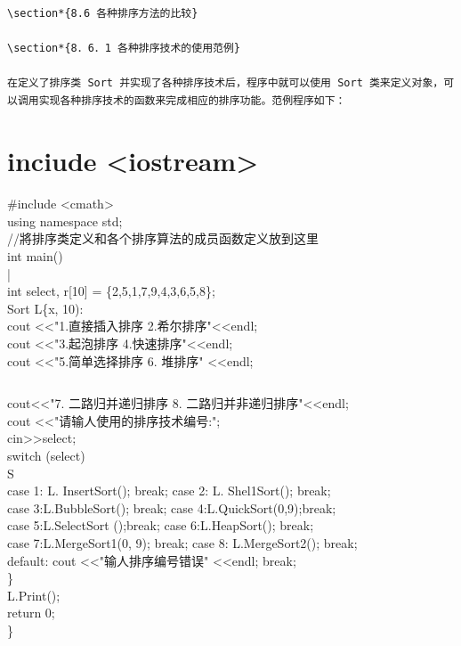 \documentclass[10pt]{article}
\begin{document}
\begin{verbatim}

\section*{8.6 各种排序方法的比较}

\section*{8．6．1 各种排序技术的使用范例}

在定义了排序类 Sort 并实现了各种排序技术后，程序中就可以使用 Sort 类来定义对象，可以调用实现各种排序技术的函数来完成相应的排序功能。范例程序如下：
\end{verbatim}

\section*{inciude <iostream>}
\#include <cmath>\\
using namespace std;\\
//將排序类定义和各个排序算法的成员函数定义放到这里\\
int main()\\
|\\[0pt]
int select, r[10] = \{2,5,1,7,9,4,3,6,5,8\};\\
Sort L\{x, 10):\\
cout <<"1.直接插入排序 2.希尔排序"<<endl;\\
cout <<"3.起泡排序 4.快速排序"<<endl;\\
cout <<"5.简单选择排序 6. 堆排序" <<endl;

\begin{verbatim}

\end{verbatim}

cout<<"7. 二路归并递归排序 8. 二路归并非递归排序"<<endl;\\
cout <<"请输人使用的排序技术编号:";\\
cin>>select;\\
switch (select)\\
S\\
case 1: L. InsertSort(); break; case 2: L. Shel1Sort(); break;\\
case 3:L.BubbleSort(); break; case 4:L.QuickSort(0,9);break;\\
case 5:L.SelectSort ();break; case 6:L.HeapSort(); break;\\
case 7:L.MergeSort1(0, 9); break; case 8: L.MergeSort2(); break;\\
default: cout <<"输人排序编号错误" <<endl; break;\\
\}\\
L.Print();\\
return 0;\\
\}
\end{document}
